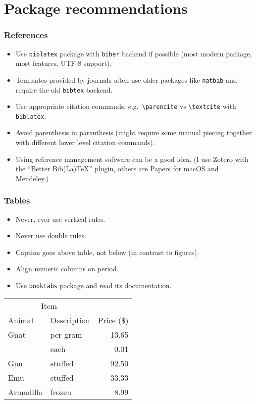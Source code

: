 \documentclass[aspectratio=1610,hyperref={colorlinks,linkcolor=}]{beamer}
\begin{document}
\section{Package recommendations}
\begin{frame}[fragile]
    \frametitle{References}
    \begin{itemize}
        \item Use \verb+biblatex+ package with \verb+biber+ backend if possible (most modern package, most features, UTF-8 support).
        \item Templates provided by journals often use older packages like \verb+natbib+ and require the old \verb+bibtex+ backend.
        \item Use appropriate citation commands, e.g.~\verb+\parencite+ vs \verb+\textcite+ with \verb+biblatex+.
        \item Avoid parenthesis in parenthesis (might require some manual piecing together with different lower level citation commands).
        \item Using reference management software can be a good idea. (I use Zotero with the ``Better Bib(La)TeX'' plugin, others are Papers for macOS and Mendeley.)  %
    \end{itemize}
\end{frame}

\begin{frame}[fragile]
    \frametitle{Tables}
    \begin{itemize}
        \item Never, ever use vertical rules.
        \item Never use double rules.
        \item Caption goes above table, not below (in contrast to figures).
        \item Align numeric columns on period.
        \item Use \verb+booktabs+ package and read its documentation.
    \end{itemize}
    \begin{center}
        \begin{tabular}{@{}llr@{}} \toprule
            \multicolumn{2}{c}{Item} \\ \cmidrule(r){1-2}
            Animal & Description & Price (\$)\\ \midrule
            Gnat & per gram & 13.65 \\
            & each & 0.01 \\
            Gnu & stuffed & 92.50 \\
            Emu & stuffed & 33.33 \\
            Armadillo & frozen & 8.99 \\ \bottomrule
        \end{tabular}
    \end{center}
\end{frame}
\end{document}
